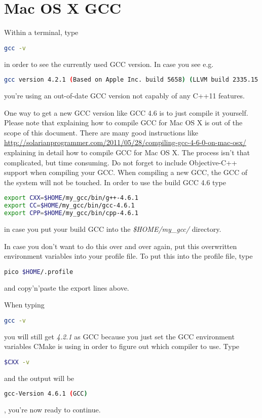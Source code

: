 \chapter{Mac OS X GCC}
\label{Appendix:MacOSX_GCC}
Within a terminal, type
\begin{lstlisting}[language=sh]
gcc -v
\end{lstlisting}
in order to see the currently used \ac{GCC} version. In case you see e.g.
\begin{lstlisting}[language=sh]
gcc version 4.2.1 (Based on Apple Inc. build 5658) (LLVM build 2335.15.00)
\end{lstlisting}
you're using an out-of-date \ac{GCC} version not capably of any C++11 features.

One way to get a new \ac{GCC} version like \ac{GCC} 4.6 is to just compile it yourself. Please note that explaining how to compile \ac{GCC} for Mac OS X is out of the scope of this document. There are many good instructions like \url{http://solarianprogrammer.com/2011/05/28/compiling-gcc-4-6-0-on-mac-osx/} explaining in detail how to compile \ac{GCC} for Mac OS X. The process isn't that complicated, but time consuming. Do not forget to include Objective-C++ support when compiling your \ac{GCC}. When compiling a new \ac{GCC}, the \ac{GCC} of the system will not be touched. In order to use the build \ac{GCC} 4.6 type
\begin{lstlisting}[language=sh]
export CXX=$HOME/my_gcc/bin/g++-4.6.1
export CC=$HOME/my_gcc/bin/gcc-4.6.1
export CPP=$HOME/my_gcc/bin/cpp-4.6.1
\end{lstlisting}
in case you put your build \ac{GCC} into the \emph{\$HOME/my\_gcc/} directory.

In case you don't want to do this over and over again, put this overwritten environment variables into your profile file. To put this into the profile file, type
\begin{lstlisting}[language=sh]
pico $HOME/.profile
\end{lstlisting}
and copy'n'paste the export lines above.

When typing
\begin{lstlisting}[language=sh]
gcc -v
\end{lstlisting}
you will still get \emph{4.2.1} as \ac{GCC} because you just set the \ac{GCC} environment variables CMake is using in order to figure out which compiler to use. Type
\begin{lstlisting}[language=sh]
$CXX -v
\end{lstlisting}
and the output will be
\begin{lstlisting}[language=sh]
gcc-Version 4.6.1 (GCC)
\end{lstlisting}
, you're now ready to continue.
